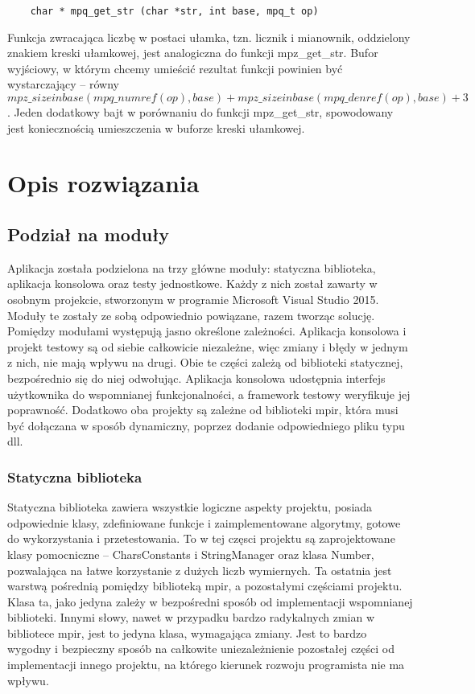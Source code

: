 \documentclass[oneside,a4paper]{book}
\begin{document}
	\begin{lstlisting}
	char * mpq_get_str (char *str, int base, mpq_t op)
	\end{lstlisting}
	
	Funkcja zwracająca liczbę w postaci ułamka, tzn. licznik i mianownik, oddzielony znakiem kreski ułamkowej, jest analogiczna do funkcji mpz\_get\_str. Bufor wyjściowy, w którym chcemy umieścić rezultat funkcji powinien być wystarczający -- równy $mpz\_sizeinbase(mpq\_numref(op), \allowbreak base) + mpz\_sizeinbase (mpq\_denref(op), base) + 3$. Jeden dodatkowy bajt w porównaniu do funkcji mpz\_get\_str, spowodowany jest koniecznością umieszczenia w buforze kreski ułamkowej.
	
	
	\chapter{Opis rozwiązania}
	\section{Podział na moduły}
	
	Aplikacja została podzielona na trzy główne moduły: statyczna biblioteka, aplikacja konsolowa oraz testy jednostkowe. Każdy z nich został zawarty w osobnym projekcie, stworzonym w programie Microsoft Visual Studio 2015. Moduły te zostały ze sobą odpowiednio powiązane, razem tworząc solucję. Pomiędzy modułami występują jasno określone zależności. Aplikacja konsolowa i projekt testowy są od siebie całkowicie niezależne, więc zmiany i błędy w jednym z nich, nie mają wpływu na drugi. Obie te części zależą od biblioteki statycznej, bezpośrednio się do niej odwołując. Aplikacja konsolowa udostępnia interfejs użytkownika do wspomnianej funkcjonalności, a framework testowy weryfikuje jej poprawność. Dodatkowo oba projekty są zależne od biblioteki mpir, która musi być dołączana w sposób dynamiczny, poprzez dodanie odpowiedniego pliku typu dll. 
	
	\subsection{Statyczna biblioteka}
	
	Statyczna biblioteka zawiera wszystkie logiczne aspekty projektu, posiada odpowiednie klasy, zdefiniowane funkcje i zaimplementowane algorytmy, gotowe do wykorzystania i przetestowania. To w tej częsci projektu są zaprojektowane klasy pomocniczne -- CharsConstants i StringManager oraz klasa Number, pozwalająca na łatwe korzystanie z dużych liczb wymiernych. Ta ostatnia jest warstwą pośrednią pomiędzy biblioteką mpir, a pozostałymi częściami projektu. Klasa ta, jako jedyna zależy w bezpośredni sposób od implementacji wspomnianej biblioteki. Innymi słowy, nawet w przypadku bardzo radykalnych zmian w bibliotece mpir, jest to jedyna klasa, wymagająca zmiany. Jest to bardzo wygodny i bezpieczny sposób na całkowite uniezależnienie pozostałej części od implementacji innego projektu, na którego kierunek rozwoju programista nie ma wpływu.
	
\end{document}
